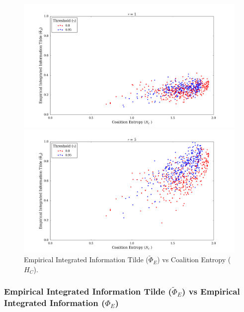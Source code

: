 \documentclass[a4paper,11pt]{article}
\begin{document}
\begin{figure}[H] 
	\begin{minipage}[b]{0.5\linewidth}
		\begin{center}
		\includegraphics[scale = 0.2]{figures/snn/phi_tilde_vs_hc_1}
		\end{center}
		\vspace{4ex}
	\end{minipage}
	\begin{minipage}[b]{0.5\linewidth}
		\begin{center}
		\includegraphics[scale = 0.2]{figures/snn/phi_tilde_vs_hc_5}
		\end{center}
		\vspace{4ex}
	\end{minipage}
	\caption{
		Empirical Integrated Information Tilde ($\widetilde{\Phi}_E$) vs Coalition Entropy ($H_C$).
		\label{fig:phi_tilde_vs_hc}
	}
\end{figure}

\subsubsection{Empirical Integrated Information Tilde ($\widetilde{\Phi}_E$) vs Empirical Integrated Information ($\Phi_E$)}
\end{document}
